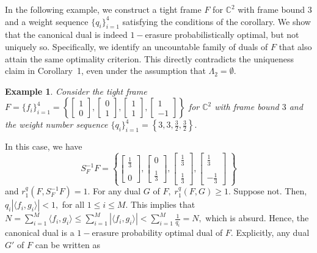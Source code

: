 \documentclass[final,1p,times]{elsarticle}
\newtheorem{example}[thm]{Example}
\begin{document}
In the following example, we construct a tight frame $F$ for $\mathbb{C}^2$ with frame bound $3$ and a weight sequence $\{q_i\}_{i=1}^4$ satisfying the conditions of the corollary. We show that the canonical dual is indeed $1-$erasure probabilistically optimal, but not uniquely so. Specifically, we identify an uncountable family of duals of $F$ that also attain the same optimality criterion. This directly contradicts the uniqueness claim in Corollary~1, even under the assumption that $\Lambda_2 = \emptyset$.









\begin{example}\label{eg3point3}
	Consider the tight frame $F= \{f_i\}_{i=1}^4 = \left\{\left[\begin{array}{l}
		1 \\0
	\end{array}\right],  \left[\begin{array}{l}
	0 \\ 1
\end{array}\right] , \left[\begin{array}{l}
1 \\ 1
\end{array}\right] , \left[\begin{array}{l}
1 \\ -1
\end{array}\right] \right\} $ for $\mathbb{C}^2$ with frame bound $3$ 
	and the weight number sequence  $\{q_i\}_{i=1}^4 = \left\{ 3,3,\frac{3}{2} , \frac{3}{2}\right\}.$
\end{example}

In this case, we have 
$$S_{F}^{-1} F = \left\{ \left[\begin{array}{r} \frac{1}{3} \\~\\ 0 \end{array}\right], \left[\begin{array}{r} 0 \\~\\ \frac{1}{3} \end{array}\right], \left[\begin{array}{l} \frac{1}{3} \\~\\ \frac{1}{3}  \end{array}\right],  \left[\begin{array}{r} \frac{1}{3} \\~\\ -\frac{1}{3} \end{array}\right] \; \right\} $$
and $r_{1}^q (F,S_{F}^{-1}F) = 1.$ For any dual $G$ of $F,\;r_{1}^q (F,G) \geq 1.$ Suppose not. Then, $ q_i |\langle f_i , g_i \rangle | < 1 ,$ for all $1 \leq i \leq M.$ This implies that  $N= \displaystyle{\sum_{i=1}^M \langle f_i , g_i \rangle \leq \sum_{i=1}^M |\langle f_i , g_i \rangle | < \sum_{i=1}^M \frac{1}{q_i} =N },$ \; which is absurd. Hence, the canonical dual is a $1-$erasure probability optimal dual of $F$. Explicitly, any dual $G'$ of $F$ can be written as 
\end{document}
